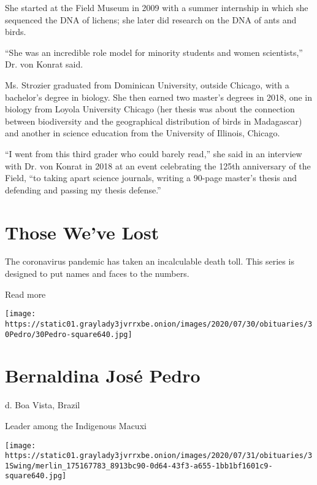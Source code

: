 She started at the Field Museum in 2009 with a summer internship in
which she sequenced the DNA of lichens; she later did research on the
DNA of ants and birds.

``She was an incredible role model for minority students and women
scientists,'' Dr. von Konrat said.

Ms. Strozier graduated from Dominican University, outside Chicago, with
a bachelor's degree in biology. She then earned two master's degrees in
2018, one in biology from Loyola University Chicago (her thesis was
about the connection between biodiversity and the geographical
distribution of birds in Madagascar) and another in science education
from the University of Illinois, Chicago.

``I went from this third grader who could barely read,'' she said in an
interview with Dr. von Konrat in 2018 at an event celebrating the 125th
anniversary of the Field, ``to taking apart science journals, writing a
90-page master's thesis and defending and passing my thesis defense.''

\href{https://www.nytimes3xbfgragh.onion/interactive/2020/obituaries/people-died-coronavirus-obituaries.html?action=click\&pgtype=Article\&state=default\&region=BELOW_MAIN_CONTENT\&context=covid_obits_promo}{}

\hypertarget{those-weve-lost}{%
\section{Those We've Lost}\label{those-weve-lost}}

The coronavirus pandemic has taken an incalculable death toll. This
series is designed to put names and faces to the numbers.

Read more

\texttt{[image: https://static01.graylady3jvrrxbe.onion/images/2020/07/30/obituaries/30Pedro/30Pedro-square640.jpg]}

\hypertarget{bernaldina-josuxe9-pedro}{%
\section{Bernaldina José Pedro}\label{bernaldina-josuxe9-pedro}}

d. Boa Vista, Brazil

Leader among the Indigenous Macuxi

\texttt{[image: https://static01.graylady3jvrrxbe.onion/images/2020/07/31/obituaries/31Swing/merlin\_175167783\_8913bc90-0d64-43f3-a655-1bb1bf1601c9-square640.jpg]}


